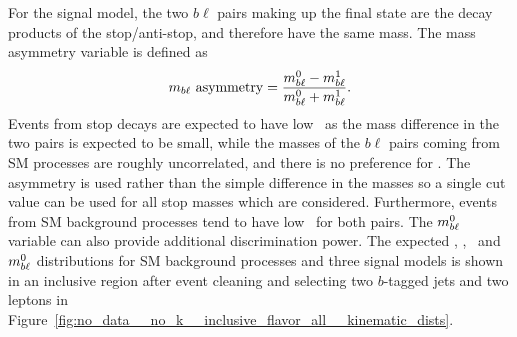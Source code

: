 For the signal model, the two $b\ell$ pairs making up the final state are the
decay products of the stop/anti-stop, and therefore have the same mass.
The mass asymmetry variable is defined as
\begin{equation}
  m_{b\ell}~\mathrm{asymmetry} = 
  \frac{m_{b\ell}^0-m_{b\ell}^1}{m_{b\ell}^0+m_{b\ell}^1}.
\end{equation}
Events from stop decays are expected to have low \MBLASYM\ as the mass
difference in the two pairs is expected to be small, while the masses of the
$b\ell$ pairs coming from SM processes are roughly uncorrelated, and there is
no preference for \MBLASYM.
The asymmetry is used rather than the simple difference in the masses so a
single cut value can be used for all stop masses which are considered.
Furthermore, events from SM background processes tend to have low \MBL\ for
both pairs.
The $m_{b\ell}^0$ variable can also provide additional discrimination power.
The expected \MLL, \HT, \MBLASYM\, and $m_{b\ell}^{0}$ distributions for SM
background processes and three signal models is shown in an inclusive region
after event cleaning and selecting two $b$-tagged jets and two leptons in
Figure~\ref{fig:no_data__no_k__inclusive_flavor_all__kinematic_dists}.

